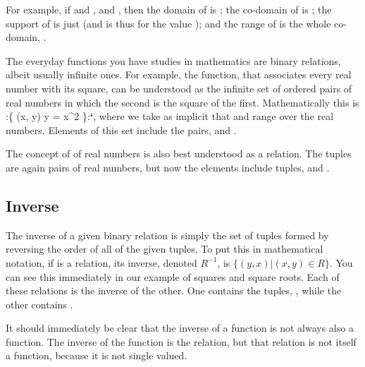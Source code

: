 \documentclass[letterpaper,10pt,english]{sphinxmanual}
\begin{document}
For example, if  and , and , then the domain of  is ; the
co-domain of  is ; the support of  is just  (and 
is thus  for the value ); and the range of  is
the whole co-domain, .

The everyday functions you have studies in mathematics are binary
relations, albeit usually infinite ones. For example, the 
function, that associates every real number with its square, can be
understood as the infinite set of ordered pairs of real numbers in
which the second is the square of the first. Mathematically this is
:\{ (x, y) \textbar{} y = x\textasciicircum{}2 \}:{\color{red}\bfseries{}{}`}, where we take as implicit that  and 
range over the real numbers. Elements of this set include the pairs,
 and .

The concept of  of real numbers is also best understood
as a relation. The tuples are again pairs of real numbers, but now the
elements include tuples,  and .


\subsection{Inverse}
\label{\detokenize{07-set-theory:inverse}}
The inverse of a given binary relation is simply the set of tuples
formed by reversing the order of all of the given tuples. To put this
in mathematical notation, if  is a relation, its inverse, denoted
\(R^{-1}\), is \(\{ (y, x) | (x, y) \in R \}\). You can see this
immediately in our example of squares and square roots. Each of these
relations is the inverse of the other. One contains the tuples, , while the other contains .

It should immediately be clear that the inverse of a function is not
always also a function. The inverse of the  function is the
 relation, but that relation is not itself a function,
because it is not single valued.
\end{document}
